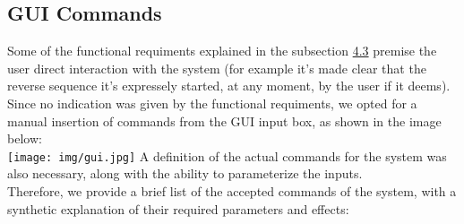 \documentclass{llncs}
\begin{document}
\subsection{GUI Commands}
Some of the functional requiments explained in the subsection \hyperref[sec:Functional requiments]{4.3} premise the user direct interaction with the system (for example it's made clear that the reverse sequence it's expressely started, at any moment, by the user if it deems).\\
Since no indication was given by the functional requiments, we opted for a \\manual insertion of commands from the GUI input box, as shown in the image below:\\

\hspace{-1cm}
 \texttt{[image: img/gui.jpg]} 
A definition of the actual commands for the system was also necessary, along with the ability to parameterize the inputs.\\
Therefore, we provide a brief list of the accepted commands of the system, with a synthetic explanation of their required parameters and effects:
\end{document}
